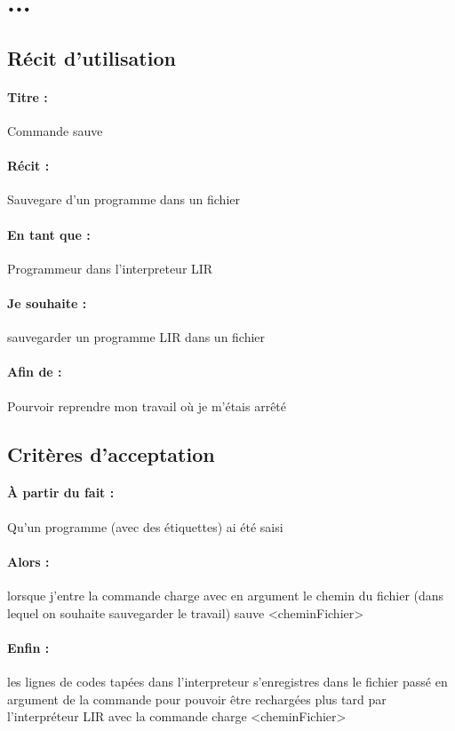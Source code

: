 \section{...} %

\subsection*{Récit d'utilisation}

\paragraph{Titre : } Commande sauve
\paragraph{Récit : } Sauvegare d'un programme dans un fichier
\paragraph{En tant que : } Programmeur dans l'interpreteur LIR
\paragraph{Je souhaite : } sauvegarder un programme LIR dans un fichier
\paragraph{Afin de : } Pourvoir reprendre mon travail où je m'étais arrêté

\subsection*{Critères d'acceptation}

\paragraph{À partir du fait : } Qu'un programme (avec des étiquettes) ai été saisi
\paragraph{Alors : } lorsque j'entre la commande charge avec en argument le chemin du fichier (dans lequel on souhaite sauvegarder le travail)
                     sauve <cheminFichier>
\paragraph{Enfin : } les lignes de codes tapées dans l'interpreteur s'enregistres dans le fichier passé en argument de la commande
                     pour pouvoir être rechargées plus tard par l'interpréteur LIR avec la commande charge <cheminFichier>
